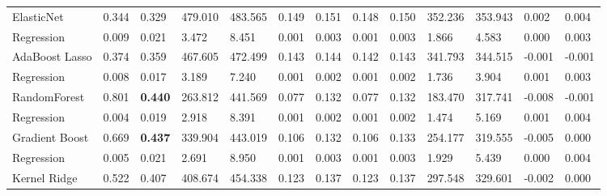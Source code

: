\documentclass{article}
\begin{document}
{\begin{longtable}[c]{|p{2.3cm}|ll|ll|ll|ll|ll|ll|}
  ElasticNet            & \multicolumn{1}{l|}{0.344} & 0.329 & \multicolumn{1}{l|}{479.010} & 483.565 & \multicolumn{1}{l|}{0.149} & 0.151 & \multicolumn{1}{l|}{0.148} & 0.150 & \multicolumn{1}{l|}{352.236} & 353.943 & \multicolumn{1}{l|}{0.002}  & 0.004  \\
  Regression& \multicolumn{1}{l|}{0.009} & 0.021 & \multicolumn{1}{l|}{3.472}   & 8.451   & \multicolumn{1}{l|}{0.001} & 0.003 & \multicolumn{1}{l|}{0.001} & 0.003 & \multicolumn{1}{l|}{1.866}   & 4.583   & \multicolumn{1}{l|}{0.000}  & 0.003  \\ \hline
  AdaBoost Lasso & \multicolumn{1}{l|}{0.374} & 0.359 & \multicolumn{1}{l|}{467.605} & 472.499 & \multicolumn{1}{l|}{0.143} & 0.144 & \multicolumn{1}{l|}{0.142} & 0.143 & \multicolumn{1}{l|}{341.793} & 344.515 & \multicolumn{1}{l|}{-0.001} & -0.001 \\
  Regression & \multicolumn{1}{l|}{0.008} & 0.017 & \multicolumn{1}{l|}{3.189}   & 7.240   & \multicolumn{1}{l|}{0.001} & 0.002 & \multicolumn{1}{l|}{0.001} & 0.002 & \multicolumn{1}{l|}{1.736}   & 3.904   & \multicolumn{1}{l|}{0.001}  & 0.003  \\ \hline
  RandomForest & \multicolumn{1}{l|}{0.801} & \textbf{0.440} & \multicolumn{1}{l|}{263.812} & 441.569 & \multicolumn{1}{l|}{0.077} & 0.132 & \multicolumn{1}{l|}{0.077} & 0.132 & \multicolumn{1}{l|}{183.470} & 317.741 & \multicolumn{1}{l|}{-0.008} & -0.001 \\
  Regression & \multicolumn{1}{l|}{0.004} & 0.019 & \multicolumn{1}{l|}{2.918}   & 8.391   & \multicolumn{1}{l|}{0.001} & 0.002 & \multicolumn{1}{l|}{0.001} & 0.002 & \multicolumn{1}{l|}{1.474}   & 5.169   & \multicolumn{1}{l|}{0.001}  & 0.004  \\ \hline
  Gradient Boost & \multicolumn{1}{l|}{0.669} & \textbf{0.437} & \multicolumn{1}{l|}{339.904} & 443.019 & \multicolumn{1}{l|}{0.106} & 0.132 & \multicolumn{1}{l|}{0.106} & 0.133 & \multicolumn{1}{l|}{254.177} & 319.555 & \multicolumn{1}{l|}{-0.005} & 0.000  \\
  Regression & \multicolumn{1}{l|}{0.005} & 0.021 & \multicolumn{1}{l|}{2.691}   & 8.950   & \multicolumn{1}{l|}{0.001} & 0.003 & \multicolumn{1}{l|}{0.001} & 0.003 & \multicolumn{1}{l|}{1.929}   & 5.439   & \multicolumn{1}{l|}{0.000}  & 0.004  \\ \hline
  Kernel Ridge & \multicolumn{1}{l|}{0.522} & 0.407 & \multicolumn{1}{l|}{408.674} & 454.338 & \multicolumn{1}{l|}{0.123} & 0.137 & \multicolumn{1}{l|}{0.123} & 0.137 & \multicolumn{1}{l|}{297.548} & 329.601 & \multicolumn{1}{l|}{-0.002} & 0.000  \\

\end{longtable}}
\end{document}
